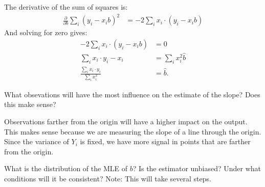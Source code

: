 The derivative of the sum of squares is:
\begin{align*}
\frac{\partial}{\partial b} \sum_i (y_i - x_i b)^2 &= -2 \sum_i x_i \cdot (y_i - x_i b)
\end{align*}
And solving for zero gives:
\begin{align*}
-2 \sum_i x_i \cdot (y_i - x_i b) &= 0\\
\sum_i x_i \cdot y_i - x_i &= \sum_i x_i^2 \widehat{b} \\
\frac{\sum_i x_i \cdot y_i}{\sum_i x_i^2} &= \widehat{b}.
\end{align*}


What obsevations will have the most influence on the estimate of the slope?
Does this make sense?


Observations farther from the origin will have a higher impact on the output.
This makes sense because we are measuring the slope of a line through the origin.
Since the variance of $Y_i$ is fixed, we have more signal in points that are 
farther from the origin.


What is the distribution of the MLE of $b$? Is the estimator unbiased? Under
what conditions will it be consistent? Note: This will take several steps.


